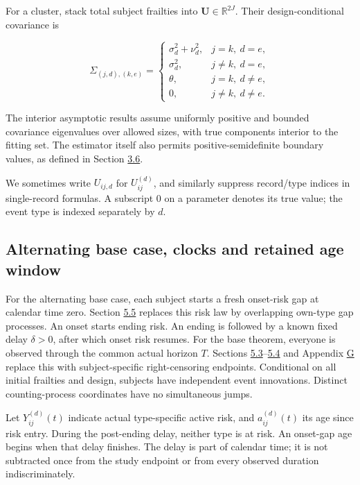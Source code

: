 \documentclass[11pt]{article}
\begin{document}
For a cluster, stack total subject frailties into \(\mathbf U\in\mathbb R^{2J}\). Their design-conditional covariance is

\begin{equation*}
\Sigma_{(j,d),(k,e)}=
\begin{cases}
\sigma_d^2+\nu_d^2,&j=k,\ d=e,\\
\sigma_d^2,&j\ne k,\ d=e,\\
\theta,&j=k,\ d\ne e,\\
0,&j\ne k,\ d\ne e .
\end{cases}\tag{3}\label{eq:3}
\end{equation*}

The interior asymptotic results assume uniformly positive and bounded covariance eigenvalues over allowed sizes, with true components interior to the fitting set. The estimator itself also permits positive-semidefinite boundary values, as defined in Section \hyperref[sec:3.6]{3.6}.

We sometimes write \(U_{ij,d}\) for \(U_{ij}^{(d)}\), and similarly suppress record/type indices in single-record formulas. A subscript \(0\) on a parameter denotes its true value; the event type is indexed separately by \(d\).

\subsection{Alternating base case, clocks and retained age window}\label{sec:2.2}

For the alternating base case, each subject starts a fresh onset-risk gap at calendar time zero. Section \hyperref[sec:5.5]{5.5} replaces this risk law by overlapping own-type gap processes. An onset starts ending risk. An ending is followed by a known fixed delay \(\delta>0\), after which onset risk resumes. For the base theorem, everyone is observed through the common actual horizon \(T\). Sections \hyperref[sec:5.3]{5.3}--\hyperref[sec:5.4]{5.4} and Appendix \hyperref[sec:G]{G} replace this with subject-specific right-censoring endpoints. Conditional on all initial frailties and design, subjects have independent event innovations. Distinct counting-process coordinates have no simultaneous jumps.

Let \(Y_{ij}^{(d)}(t)\) indicate actual type-specific active risk, and \(a_{ij}^{(d)}(t)\) its age since risk entry. During the post-ending delay, neither type is at risk. An onset-gap age begins when that delay finishes. The delay is part of calendar time; it is not subtracted once from the study endpoint or from every observed duration indiscriminately.
\end{document}
